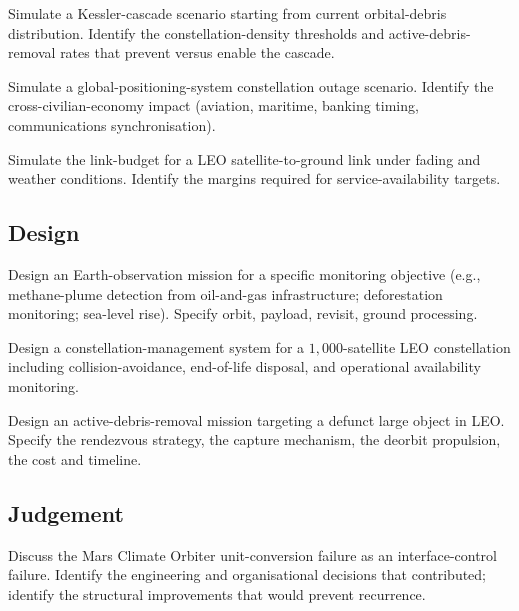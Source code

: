 \begin{exercise}
Simulate a Kessler-cascade scenario starting from current orbital-debris distribution. Identify the constellation-density thresholds and active-debris-removal rates that prevent versus enable the cascade.
\end{exercise}

\begin{exercise}
Simulate a global-positioning-system constellation outage scenario. Identify the cross-civilian-economy impact (aviation, maritime, banking timing, communications synchronisation).
\end{exercise}

\begin{exercise}
Simulate the link-budget for a LEO satellite-to-ground link under fading and weather conditions. Identify the margins required for service-availability targets.
\end{exercise}

\subsection*{Design}

\begin{exercise}
Design an Earth-observation mission for a specific monitoring objective (e.g., methane-plume detection from oil-and-gas infrastructure; deforestation monitoring; sea-level rise). Specify orbit, payload, revisit, ground processing.
\end{exercise}

\begin{exercise}
Design a constellation-management system for a $1{,}000$-satellite LEO constellation including collision-avoidance, end-of-life disposal, and operational availability monitoring.
\end{exercise}

\begin{exercise}
Design an active-debris-removal mission targeting a defunct large object in LEO. Specify the rendezvous strategy, the capture mechanism, the deorbit propulsion, the cost and timeline.
\end{exercise}

\subsection*{Judgement}

\begin{exercise}
Discuss the Mars Climate Orbiter unit-conversion failure as an interface-control failure. Identify the engineering and organisational decisions that contributed; identify the structural improvements that would prevent recurrence.
\end{exercise}

